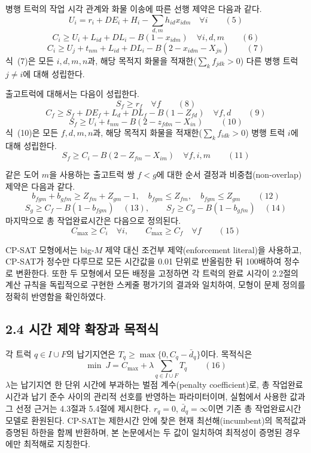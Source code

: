 \documentclass[10pt,a4paper]{article}
\begin{document}
병행 트럭의 작업 시각 관계와 화물 이송에 따른 선행 제약은 다음과 같다.
\[U_i=r_i+DE_i+H_i-\textstyle\sum_{d,m}h_{id}x_{idm}\quad\forall i \qquad (5)\]
\[C_i\ge U_i+L_{id}+DL_i-B(1-x_{idm})\quad\forall i,d,m \qquad (6)\]
\[C_i\ge U_j+t_{nm}+L_{id}+DL_i-B(2-x_{idm}-X_{jn}) \qquad (7)\]
식~(7)은 모든 $i,d,m,n$과, 해당 목적지 화물을 적재한($\sum_k f_{jdk}>0$) 다른 병행 트럭 $j\ne i$에 대해 성립한다.

출고트럭에 대해서는 다음이 성립한다.
\[S_f\ge r_f\quad\forall f \qquad (8)\]
\[C_f\ge S_f+DE_f+L_d+DL_f-B(1-Z_{fd})\quad\forall f,d \qquad (9)\]
\[S_f\ge U_i+t_{nm}-B(2-z_{fdm}-X_{in}) \qquad (10)\]
식~(10)은 모든 $f,d,m,n$과, 해당 목적지 화물을 적재한($\sum_k f_{idk}>0$) 병행 트럭 $i$에 대해 성립한다.
\[S_f\ge C_i-B(2-Z_{fm}-X_{im})\quad\forall f,i,m \qquad (11)\]

같은 도어 $m$을 사용하는 출고트럭 쌍 $f<g$에 대한 순서 결정과 비중첩(non-overlap) 제약은
다음과 같다.
\[b_{fgm}+b_{gfm}\ge Z_{fm}+Z_{gm}-1,\quad b_{fgm}\le Z_{fm},\quad b_{fgm}\le Z_{gm} \qquad (12)\]
\[S_g\ge C_f-B(1-b_{fgm}) \quad (13),\qquad S_f\ge C_g-B(1-b_{gfm}) \quad (14)\]
마지막으로 총 작업완료시간은 다음으로 정의된다.
\[C_{\max}\ge C_i\quad\forall i,\qquad C_{\max}\ge C_f\quad\forall f \qquad (15)\]

CP-SAT 모형에서는 big-$M$ 제약 대신 조건부 제약(enforcement literal)을 사용하고, CP-SAT가 정수만 다루므로
모든 시간값을 0.01 단위로 반올림한 뒤 100배하여 정수로 변환한다. 또한 두 모형에서 모든 배정을 고정하면
각 트럭의 완료 시각이 2.2절의 계산 규칙을 독립적으로 구현한 스케줄 평가기의 결과와 일치하여,
모형이 문제 정의를 정확히 반영함을 확인하였다.

\subsection{2.4 시간 제약 확장과 목적식}
각 트럭 $q\in I\cup F$의 납기지연은 $T_q\ge\max\{0,C_q-\bar d_q\}$이다. 목적식은
\[\min\ J=C_{\max}+\lambda\sum_{q\in I\cup F}T_q \qquad (16)\]
$\lambda$는 납기지연 한 단위 시간에 부과하는 벌점 계수(penalty coefficient)로, 총 작업완료시간과 납기 준수 사이의
관리적 선호를 반영하는 파라미터이며, 실험에서 사용한 값과 그 선정 근거는 4.3절과 5.4절에 제시한다. $r_q=0$, $\bar d_q=\infty$이면 기존 총 작업완료시간 모델로 환원된다. CP-SAT는 제한시간 안에 찾은 현재 최선해(incumbent)의 목적값과 증명된 하한을 함께 반환하며, 본 논문에서는 두 값이 일치하여 최적성이 증명된 경우에만 최적해로 지칭한다.
\end{document}
